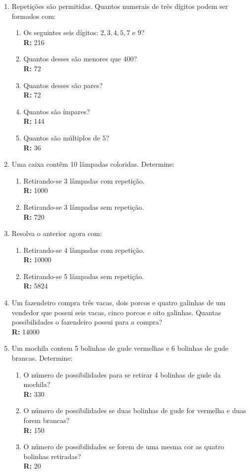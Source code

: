 \documentclass[oneside,a4paper,12pt]{article}
\begin{document}
\begin{enumerate}
	\item Repetições são permitidas. Quantos numerais de três dígitos podem ser formados com:
	\begin{enumerate}
		\item Os seguintes seis dígitos: $2,3,4,5,7$ e $9$? \\ {\bf R:}  216
		\item Quantos desses são menores que $400$? \\ {\bf R:}  72
		\item Quantos desses são pares? \\ {\bf R:}  72
		\item Quantos são ímpares? \\ {\bf R:}  144
		\item Quantos são múltiplos de $5$? \\ {\bf R:}  36
	\end{enumerate}

	\item Uma caixa contêm 10 lâmpadas coloridas. Determine:
	\begin{enumerate}
		\item Retirando-se 3 lâmpadas com repetição. \\ {\bf R:}  1000
		\item Retirando-se 3 lâmpadas sem repetição. \\ {\bf R:}  720
	\end{enumerate}

	\item Resolva o anterior agora com:
	\begin{enumerate}
		\item Retirando-se 4 lâmpadas com repetição. \\ {\bf R:}  10000
		\item Retirando-se 5 lâmpadas sem repetição. \\ {\bf R:}  5824
	\end{enumerate}
	
	\item Um fazendeiro compra três vacas, dois porcos e quatro galinhas de um vendedor que possui seis vacas, cinco porcos e oito galinhas. Quantas possibilidades o fazendeiro possui para a compra? \\ {\bf R:} 14000
	
	\item Um mochila contem 5 bolinhas de gude vermelhas e 6 bolinhas de gude brancas. Determine:
	\begin{enumerate}
		\item O número de possibilidades para se retirar 4 bolinhas de gude da mochila? \\ {\bf R:} 330
		\item O número de possibilidades se duas bolinhas de gude for vermelha e duas forem brancas? \\ {\bf R:} 150
		\item O número de possibilidades se forem de uma mesma cor as quatro bolinhas retiradas? \\ {\bf R:}  20
	\end{enumerate}


\end{enumerate}
\end{document}
